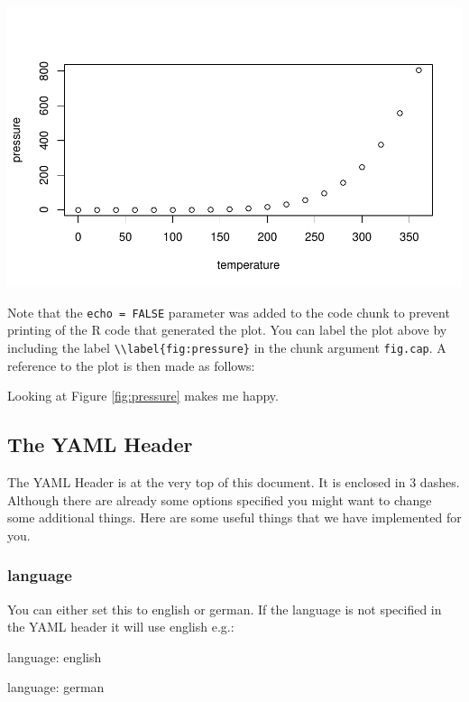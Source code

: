 \documentclass[11pt,a4paper]{article}
\let\origfigure\figure
\let\endorigfigure\endfigure
\renewenvironment{figure}[1][2] {
    \expandafter\origfigure\expandafter[H]
} {
    \endorigfigure
}
\newcommand{\pandocbounded}[1]{#1}
\begin{document}
\begin{figure}
\centering
\pandocbounded{\includegraphics[keepaspectratio]{thesis_files/figure-latex/pressure-1.pdf}}
\caption{\label{fig:pressure} Pressure}
\end{figure}

Note that the \texttt{echo\ =\ FALSE} parameter was added to the code
chunk to prevent printing of the R code that generated the plot. You can
label the plot above by including the label
\texttt{\textbackslash{}\textbackslash{}label\{fig:pressure\}} in the
chunk argument \texttt{fig.cap}. A reference to the plot is then made as
follows:

Looking at Figure \ref{fig:pressure} makes me happy.

\subsection{The YAML Header}\label{the-yaml-header}

The YAML Header is at the very top of this document. It is enclosed in 3
dashes. Although there are already some options specified you might want
to change some additional things. Here are some useful things that we
have implemented for you.

\subsubsection{language}\label{language}

You can either set this to english or german. If the language is not
specified in the YAML header it will use english e.g.:

language: english

language: german
\end{document}

